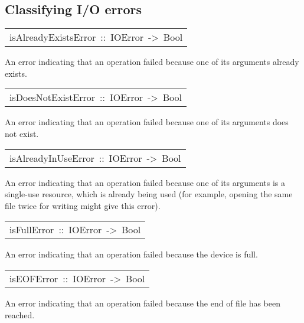 \subsection{Classifying I/O errors
}
\begin{haddockdesc}
\item[\begin{tabular}{@{}l}
isAlreadyExistsError\ ::\ IOError\ ->\ Bool
\end{tabular}]\haddockbegindoc
An error indicating that an  operation failed because
 one of its arguments already exists.
\par

\end{haddockdesc}
\begin{haddockdesc}
\item[\begin{tabular}{@{}l}
isDoesNotExistError\ ::\ IOError\ ->\ Bool
\end{tabular}]\haddockbegindoc
An error indicating that an  operation failed because
 one of its arguments does not exist.
\par

\end{haddockdesc}
\begin{haddockdesc}
\item[\begin{tabular}{@{}l}
isAlreadyInUseError\ ::\ IOError\ ->\ Bool
\end{tabular}]\haddockbegindoc
An error indicating that an  operation failed because
 one of its arguments is a single-use resource, which is already
 being used (for example, opening the same file twice for writing
 might give this error).
\par

\end{haddockdesc}
\begin{haddockdesc}
\item[\begin{tabular}{@{}l}
isFullError\ ::\ IOError\ ->\ Bool
\end{tabular}]\haddockbegindoc
An error indicating that an  operation failed because
 the device is full.
\par

\end{haddockdesc}
\begin{haddockdesc}
\item[\begin{tabular}{@{}l}
isEOFError\ ::\ IOError\ ->\ Bool
\end{tabular}]\haddockbegindoc
An error indicating that an  operation failed because
 the end of file has been reached.
\par

\end{haddockdesc}
